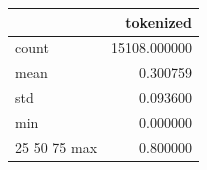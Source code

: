 \begin{tabular}{lr}
\toprule
 & tokenized \\
\midrule
count & 15108.000000 \\
mean & 0.300759 \\
std & 0.093600 \\
min & 0.000000 \\
25%
50%
75%
max & 0.800000 \\
\bottomrule
\end{tabular}

